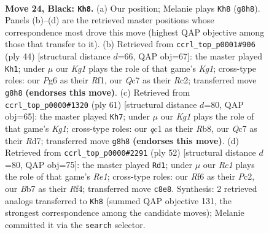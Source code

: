 \documentclass[11pt]{article}
\begin{document}
\clearpage

\begin{figure}[p]\centering
\begin{subfigure}{0.46\textwidth}\centering
\resizebox{\linewidth}{!}{%
\newchessgame
\chessboard[
  setfen={2r3k1/1bqn1p1p/5rp1/pp1Pp3/4P3/1PP3P1/5P1P/R1QK2NR b - - 1 24},
  showmover=false,
  pgfstyle=straightmove, color=movearrow, markmove={g8-h8}
]}
\caption{}
\end{subfigure}\hfill
\begin{subfigure}{0.46\textwidth}\centering
\resizebox{\linewidth}{!}{%
\newchessgame
\chessboard[
  setfen={r1q3k1/6pp/1pp5/p2pP3/3P1r2/bP1Q4/P1R2P1P/4NRK1 w - - 0 23},
  showmover=false,
  pgfstyle=straightmove, color=movearrow, markmove={g1-h1}
]}
\caption{}
\end{subfigure}
\\[4pt]
\begin{subfigure}{0.46\textwidth}\centering
\resizebox{\linewidth}{!}{%
\newchessgame
\chessboard[
  setfen={1r4k1/q2r2p1/2b1p3/pp2PpBP/2pP4/P1P2P2/1Q3KP1/1R5R b - - 5 31},
  showmover=false,
  pgfstyle=straightmove, color=movearrow, markmove={g8-h7}
]}
\caption{}
\end{subfigure}\hfill
\begin{subfigure}{0.46\textwidth}\centering
\resizebox{\linewidth}{!}{%
\newchessgame
\chessboard[
  setfen={r1r3qk/1p3pp1/2nBp2p/1p2P3/3p1R2/P4PQ1/1PP3PP/1K2R3 w - - 0 27},
  showmover=false,
  pgfstyle=straightmove, color=movearrow, markmove={e1-d1}
]}
\caption{}
\end{subfigure}
\caption{\textbf{Move 24, Black: \texttt{Kh8}.} (a) Our position; Melanie plays \texttt{Kh8} (\texttt{g8h8}). Panels (b)--(d) are the retrieved master positions whose correspondence most drove this move (highest QAP objective among those that transfer to it). (b) Retrieved from \texttt{ccrl\_top\_p0001\#906} (ply 44) [structural distance $d$=66, QAP obj=67]: the master played \texttt{Kh1}; under $\mu$ our \emph{Kg1} plays the role of that game's \emph{Kg1}; cross-type roles: our \emph{P}g6 as their \emph{R}f1, our \emph{Q}c7 as their \emph{R}c2; transferred move \texttt{g8h8} \textbf{(endorses this move)}. (c) Retrieved from \texttt{ccrl\_top\_p0000\#1320} (ply 61) [structural distance $d$=80, QAP obj=65]: the master played \texttt{Kh7}; under $\mu$ our \emph{Kg1} plays the role of that game's \emph{Kg1}; cross-type roles: our \emph{q}c1 as their \emph{R}b8, our \emph{Q}c7 as their \emph{R}d7; transferred move \texttt{g8h8} \textbf{(endorses this move)}. (d) Retrieved from \texttt{ccrl\_top\_p0000\#2291} (ply 52) [structural distance $d$=80, QAP obj=75]: the master played \texttt{Rd1}; under $\mu$ our \emph{Rc1} plays the role of that game's \emph{Re1}; cross-type roles: our \emph{R}f6 as their \emph{P}c2, our \emph{B}b7 as their \emph{R}f4; transferred move \texttt{c8e8}. Synthesis: 2 retrieved analogs transferred to \texttt{Kh8} (summed QAP objective 131, the strongest correspondence among the candidate moves); Melanie committed it via the \texttt{search} selector.}
\label{fig:thought-m47}
\end{figure}
\end{document}
